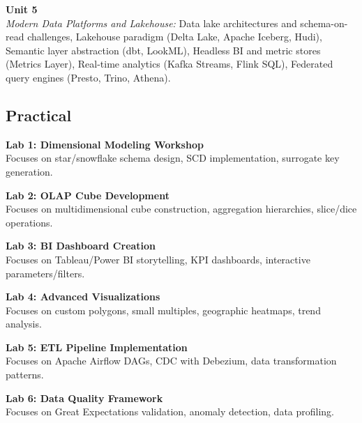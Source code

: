 \vspace{0.3cm}

\noindent\textbf{Unit 5} \\
\textit{Modern Data Platforms and Lakehouse:} Data lake architectures and schema-on-read challenges, Lakehouse paradigm (Delta Lake, Apache Iceberg, Hudi), Semantic layer abstraction (dbt, LookML), Headless BI and metric stores (Metrics Layer), Real-time analytics (Kafka Streams, Flink SQL), Federated query engines (Presto, Trino, Athena).

\newpage

\subsection*{Practical}
\noindent\textbf{Lab 1: Dimensional Modeling Workshop} \\
Focuses on star/snowflake schema design, SCD implementation, surrogate key generation.

\vspace{0.2cm}

\noindent\textbf{Lab 2: OLAP Cube Development} \\
Focuses on multidimensional cube construction, aggregation hierarchies, slice/dice operations.

\vspace{0.2cm}

\noindent\textbf{Lab 3: BI Dashboard Creation} \\
Focuses on Tableau/Power BI storytelling, KPI dashboards, interactive parameters/filters.

\vspace{0.2cm}

\noindent\textbf{Lab 4: Advanced Visualizations} \\
Focuses on custom polygons, small multiples, geographic heatmaps, trend analysis.

\vspace{0.2cm}

\noindent\textbf{Lab 5: ETL Pipeline Implementation} \\
Focuses on Apache Airflow DAGs, CDC with Debezium, data transformation patterns.

\vspace{0.2cm}

\noindent\textbf{Lab 6: Data Quality Framework} \\
Focuses on Great Expectations validation, anomaly detection, data profiling.

\vspace{0.2cm}

